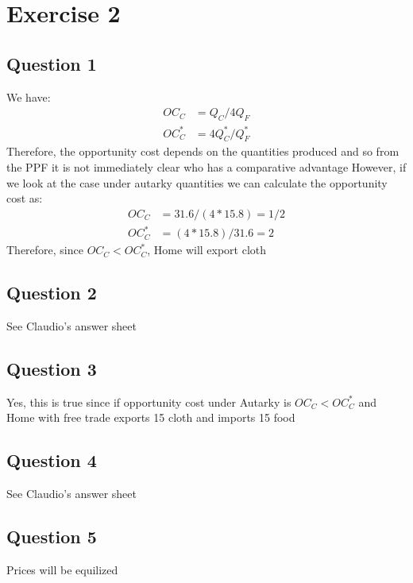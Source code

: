 \documentclass{article}
\begin{document}
\newpage

\section{Exercise 2}
\vspace{6mm}
\subsection{Question 1}

We have:
\begin{align*}
  OC_{C} &= Q_{C}/4Q_{F} \\
  OC_{C}^{*} &= 4Q_{C}^{*}/Q_{F}^{*}
\end{align*}
Therefore, the opportunity cost depends on the quantities produced and so from the PPF it is not immediately clear who has a comparative advantage
However, if we look at the case under autarky quantities we can calculate the opportunity cost as:
\begin{align*}
  OC_{C} &= 31.6/(4*15.8) = 1/2 \\
  OC_{C}^{*} &= (4*15.8)/31.6 = 2
\end{align*}
Therefore, since $OC_{C} < OC_{C}^{*}$, Home will export cloth

\par \vspace{0.8em}
\subsection{Question 2}

See Claudio's answer sheet

\par \vspace{0.8em}
\subsection{Question 3}

Yes, this is true since if opportunity cost under Autarky is $OC_{C} < OC_{C}^{*}$ and Home with free trade exports 15 cloth and imports 15 food

\par \vspace{0.8em}
\subsection{Question 4}

See Claudio's answer sheet

\par \vspace{0.8em}
\subsection{Question 5}

Prices will be equilized
\end{document}
